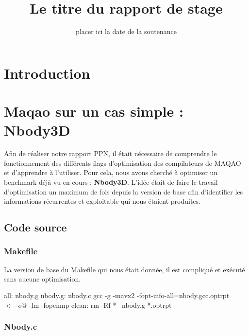 \documentclass[a4paper, 12pt, twoside]{article}
\author{}
\title{Le titre du rapport de stage}
\date{placer ici la date de la soutenance}
\begin{document}
\pagedegarde




\tableofcontents
\newpage
\listoffigures

\newpage

\section{Introduction}

\section{Maqao sur un cas simple : Nbody3D}


Afin de réaliser notre rapport PPN, il était nécessaire de comprendre le fonctionnement des différents flags d'optimisation des compilateurs de MAQAO et d'apprendre à l'utiliser. Pour cela, nous avons cherché à optimiser un benchmark déjà vu en cours : \textbf{Nbody3D}. L'idée était de faire le travail d'optimisation un maximum de fois depuis la version de base afin d'identifier les informations récurrentes et
exploitable qui nous étaient produites.


\subsection{Code source}

\subsubsection{Makefile}
La version de base du Makefile qui nous était donnée, il est compliqué et exécuté sans aucune optimisation.
	
\begin{customFrame}
all: nbody.g
nbody.g: nbody.c
	gcc -g -mavx2 -fopt-info-all=nbody.gcc.optrpt $< -o $@ -lm -fopenmp
clean:
	rm -Rf *~ nbody.g  *.optrpt

\end{customFrame}


\subsubsection{Nbody.c}
\end{document}
